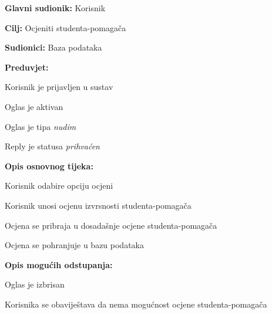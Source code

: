 					\noindent {}
					\begin{packed_item}
	
						\item \textbf{Glavni sudionik: } Korisnik
						\item  \textbf{Cilj:} Ocjeniti studenta-pomagača
						\item  \textbf{Sudionici:} Baza podataka
						\item  \textbf{Preduvjet:} 
						    \begin{packed_enum}
	
							\item Korisnik je prijavljen u sustav
							\item Oglas je aktivan
							\item Oglas je tipa \textit{nudim}
							\item Reply je statusa \textit{prihvaćen}
						    \end{packed_enum}
						\item  \textbf{Opis osnovnog tijeka:}
						
						\item[] \begin{packed_enum}
	
							\item Korisnik odabire opciju ocjeni
							\item Korisnik unosi ocjenu izvrsnosti studenta-pomagača
							\item Ocjena se pribraja u dosadašnje ocjene studenta-pomagača
							\item Ocjena se pohranjuje u bazu podataka
						\end{packed_enum}
						
						\item  \textbf{Opis mogućih odstupanja:}
						
						\item[] \begin{packed_item}
	
							\item[2.a] Oglas je izbrisan
							\item[] \begin{packed_enum}
								
								\item Korisnika se obaviještava da nema mogućnost ocjene studenta-pomagača
								
							\end{packed_enum}

							
						\end{packed_item}
						
					
					\end{packed_item}
					
